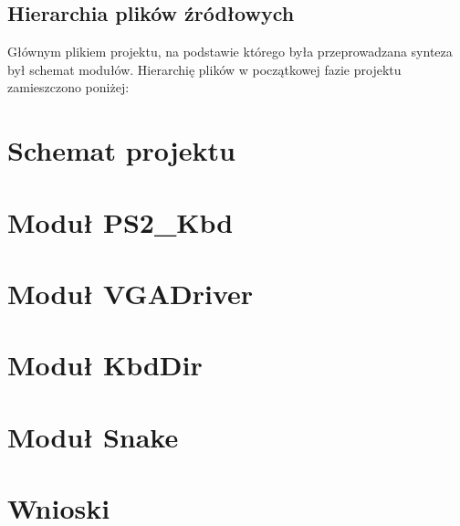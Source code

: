 \documentclass[12pt]{article}
\begin{document}
\subsection{Hierarchia plików źródłowych}
Głównym plikiem projektu, na podstawie którego była przeprowadzana synteza był schemat modułów.
Hierarchię plików w początkowej fazie projektu zamieszczono poniżej:
\clearpage
\section{Schemat projektu}
\newpage
\section{Moduł PS2\_Kbd}
\section{Moduł VGADriver}
\section{Moduł KbdDir}
\section{Moduł Snake}
\section{Wnioski}
\end{document}

